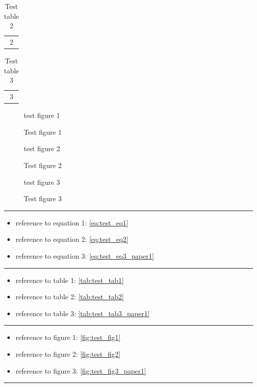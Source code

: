 \begin{table}
	\centering
	\begin{tabular}{c}
		2
	\end{tabular}
	\caption{Test table 2}
	\label{tab:test_tab2}
\end{table}

\begin{table}
	\centering
	\begin{tabular}{c}
		3
	\end{tabular}
	\caption{Test table 3}
	\label{tab:test_tab3_paper1}
\end{table}

%
\begin{figure}[h!]
	\centering
	test figure 1
	\caption{Test figure 1}
	\label{fig:test_fig1}
\end{figure}

\begin{figure}[h!]
	\centering
	test figure 2
	\caption{Test figure 2}
	\label{fig:test_fig2}
\end{figure}

\begin{figure}[h!]
	\centering
	test figure 3
	\caption{Test figure 3}
	\label{fig:test_fig3_paper1}
\end{figure}

%
\hrule
\begin{itemize}
	\item reference to equation 1: \eqref{eq:test_eq1}
	\item reference to equation 2: \eqref{eq:test_eq2}
	\item reference to equation 3: \eqref{eq:test_eq3_paper1}
\end{itemize}
\hrule
\begin{itemize}
	\item reference to table 1: \eqref{tab:test_tab1}
	\item reference to table 2: \eqref{tab:test_tab2}
	\item reference to table 3: \eqref{tab:test_tab3_paper1}
\end{itemize}
\hrule
\begin{itemize}
	\item reference to figure 1: \eqref{fig:test_fig1}
	\item reference to figure 2: \eqref{fig:test_fig2}
	\item reference to figure 3: \eqref{fig:test_fig3_paper1}
\end{itemize}
\hrule



%

%
